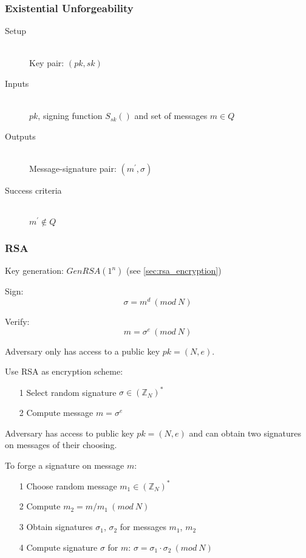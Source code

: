 \documentclass[a4paper]{article}
\begin{document}
\subsubsection{Existential Unforgeability}

\begin{description}
  \item[Setup] \hfill \\
    Key pair: $(pk, sk)$
  \item[Inputs] \hfill \\
    $pk$, signing function $S_{sk}()$ and set of messages $m \in Q$
  \item[Outputs] \hfill \\
    Message-signature pair: $(m^{\prime}, \sigma)$
  \item[Success criteria] \hfill \\
    $m^{\prime} \not\in Q$
\end{description}

\subsubsection{RSA}

Key generation: $GenRSA(1^{n})$ (see \ref{sec:rsa_encryption})

Sign:
\[
  \sigma = m^{d} \: (mod \: N)
\]

Verify:
\[
  m = \sigma^{e} \: (mod \: N)
\]


Adversary only has access to a public key $pk = (N, e)$.

Use RSA as encryption scheme:
\begin{enumerate}
  \item[1] Select random signature $\sigma \in (\mathbb{Z}_{N})^{*}$
  \item[2] Compute message $m = \sigma^{e}$
\end{enumerate}


Adversary has access to public key $pk = (N, e)$ and can obtain two signatures
on messages of their choosing.

To forge a signature on message $m$:
\begin{enumerate}
  \item[1] Choose random message $m_{1} \in (\mathbb{Z}_{N})^{*}$
  \item[2] Compute $m_{2} = m / m_{1} \: (mod \: N)$
  \item[3] Obtain signatures $\sigma_{1}$, $\sigma_{2}$ for messages $m_{1}$,
           $m_{2}$
  \item[4] Compute signature $\sigma$ for $m$: $\sigma = \sigma_{1} \cdot
           \sigma_{2} \: (mod \: N)$
\end{enumerate}
\end{document}
